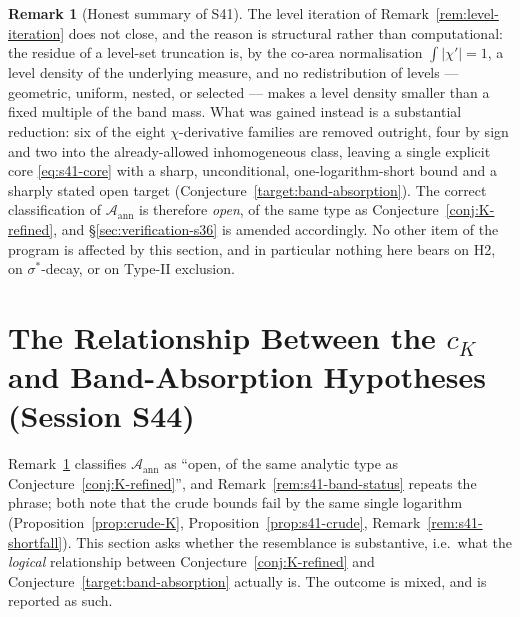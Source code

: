 \documentclass[11pt]{article}
\theoremstyle{definition}
\newtheorem{remark}[theorem]{Remark}
\theoremstyle{remark}
\begin{document}
\begin{remark}[Honest summary of S41]\label{rem:s41-summary}
  The level iteration of Remark~\ref{rem:level-iteration} does not close, and
  the reason is structural rather than computational: the residue of a
  level-set truncation is, by the co-area normalisation
  $\int|\chi'|=1$, a level density of the underlying measure, and no
  redistribution of levels --- geometric, uniform, nested, or selected ---
  makes a level density smaller than a fixed multiple of the band mass.
  What was gained instead is a substantial reduction: six of the eight
  $\chi$-derivative families are removed outright, four by sign and two into
  the already-allowed inhomogeneous class, leaving a single explicit core
  \eqref{eq:s41-core} with a sharp, unconditional, one-logarithm-short
  bound and a sharply stated open target
  (Conjecture~\ref{target:band-absorption}). The correct classification of
  $\mathcal{A}_{\mathrm{ann}}$ is therefore \emph{open}, of the same type as
  Conjecture~\ref{conj:K-refined}, and \S\ref{sec:verification-s36} is
  amended accordingly. No other item of the program is affected by this
  section, and in particular nothing here bears on H2, on
  $\sigma^*$-decay, or on Type-II exclusion.
\end{remark}

\section{The Relationship Between the $c_K$ and Band-Absorption Hypotheses
(Session S44)}
\label{sec:relation-s44}

Remark~\ref{rem:s41-summary} classifies $\mathcal{A}_{\mathrm{ann}}$ as
``open, of the same analytic type as Conjecture~\ref{conj:K-refined}'', and
Remark~\ref{rem:s41-band-status} repeats the phrase; both note that the crude
bounds fail by the same single logarithm
(Proposition~\ref{prop:crude-K}, Proposition~\ref{prop:s41-crude},
Remark~\ref{rem:s41-shortfall}). This section asks whether the resemblance is
substantive, i.e.\ what the \emph{logical} relationship between
Conjecture~\ref{conj:K-refined} and Conjecture~\ref{target:band-absorption}
actually is. The outcome is mixed, and is reported as such.
\end{document}
